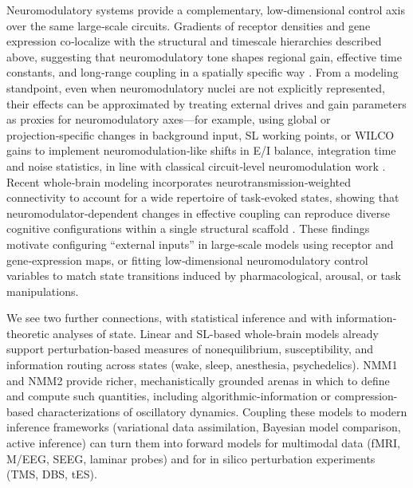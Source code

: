 \documentclass[11pt]{article}
\numberwithin{equation}{section}
\newcommand{\rev}[1]{\begingroup\color{black}#1\endgroup}
\begin{document}
Neuromodulatory systems provide a complementary, low‑dimensional control axis over the same large‑scale circuits. Gradients of receptor densities and gene expression co‑localize with the structural and timescale hierarchies described above, suggesting that neuromodulatory tone shapes regional gain, effective time constants, and long‑range coupling in a spatially specific way \cite{demirtasHierarchicalHeterogeneityHuman2019,burtHierarchyTranscriptomicSpecialization2018}. From a modeling standpoint, even when neuromodulatory nuclei are not explicitly represented, their effects can be approximated by treating external drives and gain parameters as proxies for neuromodulatory axes—for example, using global or projection‑specific changes in background input, SL working points, or WILCO gains to implement neuromodulation‑like shifts in E/I balance, integration time and noise statistics, in line with classical circuit‑level neuromodulation work \cite{marderNeuromodulationNeuronalCircuits2012}. Recent whole‑brain modeling incorporates neurotransmission‑weighted connectivity to account for a wide repertoire of task‑evoked states, showing that neuromodulator‑dependent changes in effective coupling can reproduce diverse cognitive configurations within a single structural scaffold  \cite{decoEvolutionsBoldestTrick2025}. These findings motivate configuring “external inputs” in large‑scale models using receptor and gene‑expression maps, or fitting low‑dimensional neuromodulatory control variables to match state transitions induced by pharmacological, arousal, or task manipulations.

\rev{We see two further connections, with statistical inference and with information-theoretic analyses of state.} Linear and SL-based whole-brain models already support perturbation-based measures of nonequilibrium, susceptibility, and information routing across states (wake, sleep, anesthesia, psychedelics).\cite{decoTurbulentlikeDynamicsHuman2020,Escrichs2022Turbulence,cruzatEffectsClassicPsychedelic2022} NMM1 and NMM2 provide richer, mechanistically grounded arenas in which to define and compute such quantities, including algorithmic-information or compression-based characterizations of oscillatory dynamics. Coupling these models to modern inference frameworks (variational data assimilation, Bayesian model comparison, active inference) can turn them into forward models for multimodal data (fMRI, M/EEG, SEEG, laminar probes) and for in silico perturbation experiments (TMS, DBS, tES).\cite{breakspearDynamicModelsLargescale2017,Sadeghi2020,duchetHowDesignOptimal2024,ruffiniAlgorithmicAgentPerspective2024} 
\end{document}

